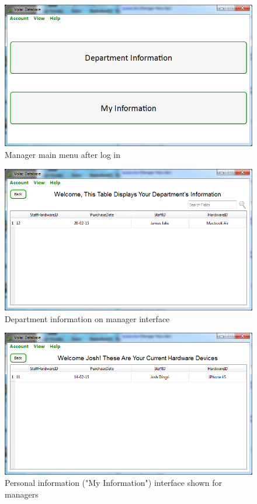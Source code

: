 \begin{figure}[H]
    \includegraphics[width=\textwidth]{./Maintenance/Images/ManagerMM.png}
    \caption{Manager main menu after log in} \label{fig:ManagerMM}
\end{figure}

\begin{figure}[H]
    \includegraphics[width=\textwidth]{./Maintenance/Images/departinfo.png}
    \caption{Department information on manager interface} \label{fig:departinfo}
\end{figure}

\begin{figure}[H]
    \includegraphics[width=\textwidth]{./Maintenance/Images/myinfomanager.png}
    \caption{Personal information ("My Information") interface shown for managers} \label{fig:myinfomanager}
\end{figure}

